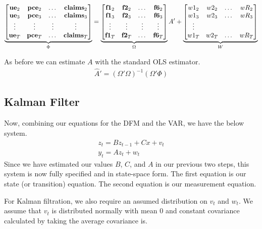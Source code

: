 \documentclass[11pt, letterpaper]{article}
\newcommand{\vv}[1]{\textcolor{black}{\mathbf{#1}}}
\begin{document}
\begin{equation}
\underbrace{\begin{bmatrix}
\vv{ue}_{2} & \vv{pce}_{2} & \dots & \vv{claims}_{2}\\
\vv{ue}_{3} & \vv{pce}_{3} & \dots & \vv{claims}_{3}\\
\vdots & \vdots & \vdots & \vdots \\
\vv{ue}_{T} & \vv{pce}_{T} & \dots & \vv{claims}_{T}\\
\end{bmatrix}}_{\Phi}
=
\underbrace{\begin{bmatrix}
\vv{f1}_{2} & \vv{f2}_{2} & \dots & \vv{f6}_{2}\\
\vv{f1}_{3} & \vv{f2}_{3} & \dots & \vv{f6}_{3}\\
\vdots & \vdots & \vdots & \vdots \\
\vv{f1}_{T} & \vv{f2}_{T} & \dots & \vv{f6}_{T}\\
\end{bmatrix}}_{\Omega}
A'
 +
\underbrace{\begin{bmatrix}
w1_2 & w2_2 & \dots & wR_2\\
w1_3 & w2_3 & \dots & wR_3\\
\vdots\\
w1_T & w2_T & \dots & wR_T\\
\end{bmatrix}}_{W}
\end{equation}

As before we can estimate $A$ with the standard OLS estimator.
\begin{align*}
\widehat{A}' = (\Omega' \Omega)^{-1} (\Omega'\Phi)
\end{align*}


\subsection{Kalman Filter}
Now, combining our equations for the DFM and the VAR, we have the below system.
\begin{align*}
z_t = B z_{t-1} + Cx + v_t\\
y_t = A z_t + w_t
\end{align*}
Since we have estimated our values $B$, $C$, and $A$ in our previous two steps, this system is now fully specified and in state-space form. The first equation is our state (or transition) equation. The second equation is our measurement equation. 

For Kalman filtration, we also require an assumed distribution on $v_t$ and $w_t$. We assume that $v_t$ is distributed normally with mean 0 and constant covariance calculated by taking the average covariance is.
\end{document}
